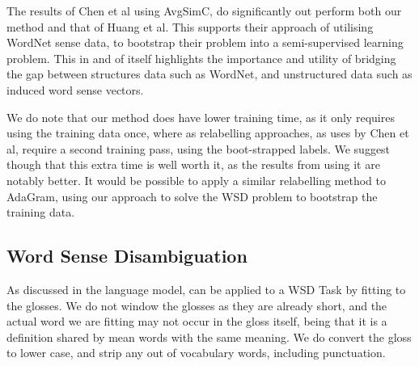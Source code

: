 \documentclass{sig-alternate}
\begin{document}
\begin{comment}
We suggest that RefittedSim with geometric smoothing, is a more appropriate method that AvgSimC when working with probabilities directly taken from a word sense language model such as AdaGram or the Greedy embeddings we defined as a baseline. 
The methods presented by Reisinger and Mooney, Huang et al. and Iacobacci et al., do not work with sense probabilities taken from a language model; rather their methods use a distance measure to approximate fuzzy membership of cluster or a degree of relatedness to the sense vector \parencite{Reisinger2010,Huang2012,iacobacci2015sensembed}. The distance measure itself imposes a particular curve onto the distribution of distances i.e. onto the assumed probabilities used in AvgSimC; and this particular distribution, solves the data sparsity problem that we solve with geometric smoothing.
The method presented by Chen et al. is significantly different, in that it has the predicted sense of the context words as an output (rather than an input) of it's model, and so has a different distribution from either of our methods, or from the  distance methods discussed. Further, it re-label it's training data and then fine tunes it's sense embeddings.
\end{comment}


The results of Chen et al using AvgSimC, do significantly out perform both our method and that of Huang et al. This supports their approach of utilising WordNet sense data, to bootstrap their problem into a semi-supervised learning problem. This in and of itself highlights the importance and utility of bridging the gap between structures data such as WordNet, and unstructured data such as induced word sense vectors.


We do note that our method does have lower training time, as it only requires using the training data once, where as relabelling approaches, as uses by Chen et al, require a second training pass, using the boot-strapped labels. We suggest though that this extra time is well worth it, as the results from using it are notably better. It would be possible to apply a similar relabelling method to AdaGram, using our approach to solve the WSD problem to bootstrap the training data.

\subsection{Word Sense Disambiguation}

As discussed in  the language model, can be applied to a WSD Task by fitting to the glosses. We do not window the glosses as they are already short, and the actual word we are fitting may not occur in the gloss itself, being that it is a definition shared by mean words with the same meaning. We do convert the gloss to lower case, and strip any out of vocabulary words, including punctuation.
\end{document}
